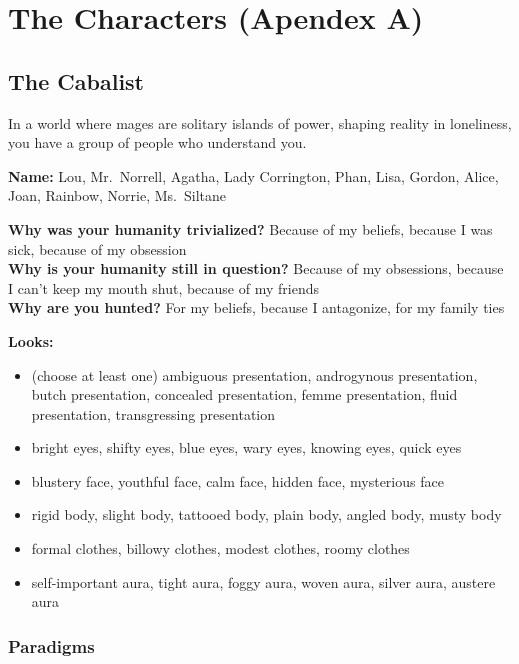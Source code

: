 \documentclass[
  oneside,
  statementpaper,
  9pt]{memoir}
\begin{document}
\setlength{\parindent}{0em}

\hypertarget{the-characters-apendex-a}{%
\chapter{The Characters (Apendex A)}\label{the-characters-apendex-a}}

\hypertarget{the-cabalist}{%
\section{The Cabalist}\label{the-cabalist}}

In a world where mages are solitary islands of power, shaping reality in
loneliness, you have a group of people who understand you.

\textbf{Name:} Lou, Mr.~Norrell, Agatha, Lady Corrington, Phan, Lisa,
Gordon, Alice, Joan, Rainbow, Norrie, Ms.~Siltane

\textbf{Why was your humanity trivialized?} Because of my beliefs,
because I was sick, because of my obsession\\
\textbf{Why is your humanity still in question?} Because of my
obsessions, because I can't keep my mouth shut, because of my friends\\
\textbf{Why are you hunted?} For my beliefs, because I antagonize, for
my family ties

\textbf{Looks:}

\begin{itemize}
\tightlist
\item
  (choose at least one) ambiguous presentation, androgynous
  presentation, butch presentation, concealed presentation, femme
  presentation, fluid presentation, transgressing presentation
\item
  bright eyes, shifty eyes, blue eyes, wary eyes, knowing eyes, quick
  eyes
\item
  blustery face, youthful face, calm face, hidden face, mysterious face
\item
  rigid body, slight body, tattooed body, plain body, angled body, musty
  body
\item
  formal clothes, billowy clothes, modest clothes, roomy clothes
\item
  self-important aura, tight aura, foggy aura, woven aura, silver aura,
  austere aura
\end{itemize}

\hypertarget{paradigms}{%
\subsection{Paradigms}\label{paradigms}}
\end{document}
